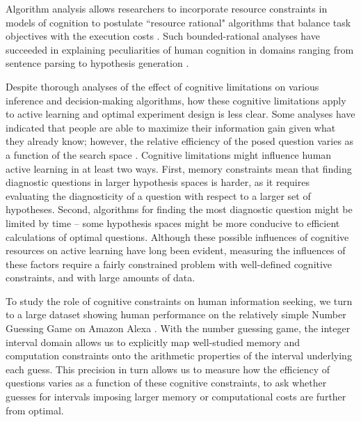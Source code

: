 \documentclass[10pt,letterpaper]{article}
\begin{document}
Algorithm analysis allows researchers to incorporate resource constraints in models of cognition to postulate ``resource rational" algorithms that balance task objectives with the execution costs  \cite{LiederResourcerationalanalysisUnderstanding2020, gershman2015computational}.  
Such bounded-rational analyses have succeeded in explaining peculiarities of human cognition in domains ranging from sentence parsing \cite{levy2009modeling} to hypothesis generation \cite{dasgupta2018remembrance}.  


Despite thorough analyses of the effect of cognitive limitations on various inference and decision-making algorithms, how these cognitive limitations apply to active learning and optimal experiment design is less clear. 
Some analyses have indicated that people are able to maximize their information gain given what they already know; however, the relative efficiency of the posed question varies as a function of the search space \cite{GureckisActiveLearningStrategies2009}.
Cognitive limitations might influence human active learning in at least two ways.  
First, memory constraints mean that finding diagnostic questions in larger hypothesis spaces is harder, as it requires evaluating the diagnosticity of a question with respect to a larger set of hypotheses.
Second, algorithms for finding the most diagnostic question might be limited by time -- some hypothesis spaces might be more conducive to efficient calculations of optimal questions.
Although these possible influences of cognitive resources on active learning have long been evident, measuring the influences of these factors require a fairly constrained problem with well-defined cognitive constraints, and with large amounts of data.

To study the role of cognitive constraints on human information seeking, we turn to a large dataset showing human performance on the relatively simple Number Guessing Game on Amazon Alexa \cite{Dobsonguessinggamemldataset2019}.
With the number guessing game, the integer interval domain allows us to explicitly map well-studied memory and computation constraints onto the arithmetic properties of the interval underlying each guess. 
This precision in turn allows us to measure how the efficiency of questions varies as a function of these cognitive constraints, to ask whether guesses for intervals imposing larger memory or computational costs are further from optimal.
\end{document}
